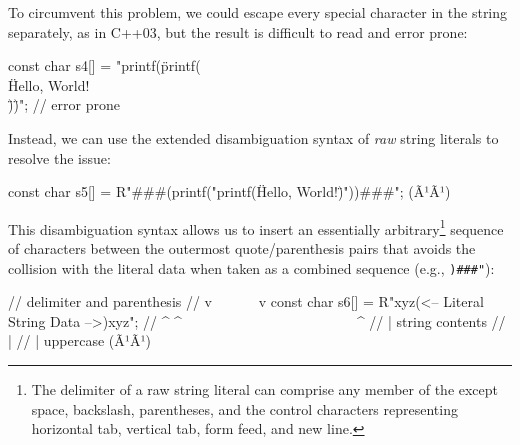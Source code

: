 \noindent To circumvent this problem, we could escape every special character in
the string separately, as in C++03, but the result is difficult to read
and error prone:

\begin{emcppslisting}[language=C++]
const char s4[] = "printf(\"printf(\\\"Hello, World!\\\")\")";  // error prone
\end{emcppslisting}
    
\noindent Instead, we can use the extended disambiguation syntax of \emph{raw}
string literals to resolve the issue:

\begin{emcppslisting}[language=C++]
const char s5[] = R"###(printf("printf(\"Hello, World!\")"))###";  (Ã¹{}Ã¹)
\end{emcppslisting}

    
\noindent This disambiguation syntax allows us to insert an essentially
arbitrary{\cprotect\footnote{The delimiter of a raw string literal can
comprise any member of the  except
space, backslash, parentheses, and the control characters representing
  horizontal tab, vertical tab, form feed, and new line.}} sequence of
characters between the outermost quote/parenthesis pairs that avoids the
collision with the literal data when taken as a combined sequence (e.g.,
\lstinline!)###"!):

\begin{emcppslisting}[language=C++]
//                       delimiter and parenthesis
//                  v~~~                           ~~~v
const char s6[] = R"xyz(<-- Literal String Data -->)xyz";
//                ^     ^~~~~~~~~~~~~~~~~~~~~~~~~~^
//                |          string contents
//                |
//                | uppercase (Ã¹{}Ã¹)
\end{emcppslisting}
    

